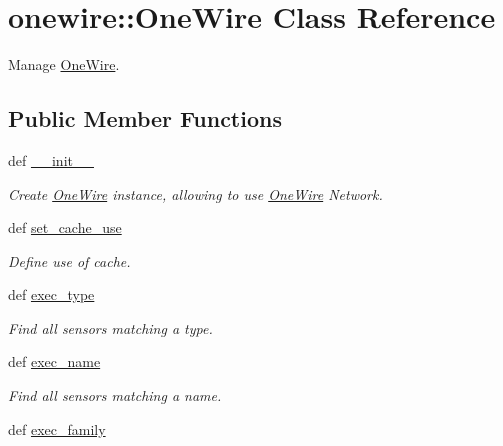 \hypertarget{classonewire_1_1OneWire}{
\section{onewire::OneWire Class Reference}
\label{classonewire_1_1OneWire}
}
Manage \hyperlink{classonewire_1_1OneWire}{OneWire}.  


\subsection*{Public Member Functions}
\begin{CompactItemize}
\item 
def \hyperlink{classonewire_1_1OneWire_effc317af881a97edf6d7dd77c63b88c}{\_\-\_\-init\_\-\_\-}
\begin{CompactList}\small\item\em Create \hyperlink{classonewire_1_1OneWire}{OneWire} instance, allowing to use \hyperlink{classonewire_1_1OneWire}{OneWire} Network. \item\end{CompactList}\item 
def \hyperlink{classonewire_1_1OneWire_41228b6b8c1562f02d0b40c8e40d96b4}{set\_\-cache\_\-use}
\begin{CompactList}\small\item\em Define use of cache. \item\end{CompactList}\item 
\hypertarget{classonewire_1_1OneWire_8c52e866328b82976eb9f799f891f487}{
def \hyperlink{classonewire_1_1OneWire_8c52e866328b82976eb9f799f891f487}{exec\_\-type}}
\label{classonewire_1_1OneWire_8c52e866328b82976eb9f799f891f487}

\begin{CompactList}\small\item\em Find all sensors matching a type. \item\end{CompactList}\item 
\hypertarget{classonewire_1_1OneWire_db399d215bf72b5084d5cbbefbdd62a9}{
def \hyperlink{classonewire_1_1OneWire_db399d215bf72b5084d5cbbefbdd62a9}{exec\_\-name}}
\label{classonewire_1_1OneWire_db399d215bf72b5084d5cbbefbdd62a9}

\begin{CompactList}\small\item\em Find all sensors matching a name. \item\end{CompactList}\item 
\hypertarget{classonewire_1_1OneWire_23324150ab22b72b6c32054003b400fd}{
def \hyperlink{classonewire_1_1OneWire_23324150ab22b72b6c32054003b400fd}{exec\_\-family}}
\label{classonewire_1_1OneWire_23324150ab22b72b6c32054003b400fd}


\end{CompactItemize}
